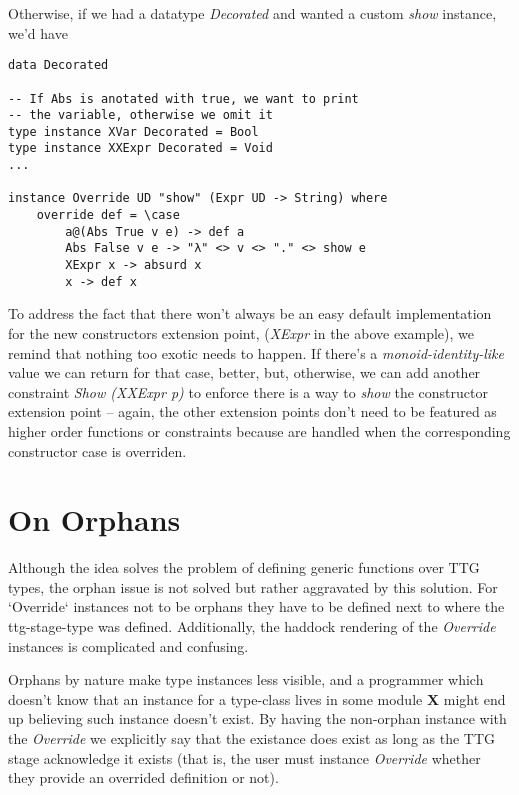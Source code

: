 \documentclass{article}
\begin{document}
Otherwise, if we had a datatype \emph{Decorated} and wanted a custom \emph{show}
instance, we'd have

\begin{lstlisting}
data Decorated

-- If Abs is anotated with true, we want to print
-- the variable, otherwise we omit it
type instance XVar Decorated = Bool
type instance XXExpr Decorated = Void
...

instance Override UD "show" (Expr UD -> String) where
    override def = \case
        a@(Abs True v e) -> def a
        Abs False v e -> "λ" <> v <> "." <> show e
        XExpr x -> absurd x
        x -> def x
\end{lstlisting}

To address the fact that there won't always be an easy default implementation
for the new constructors extension point, (\emph{XExpr} in the above example),
we remind that nothing too exotic needs to happen. If there's a
\emph{monoid-identity-like} value we can return for that case, better, but,
otherwise, we can add another constraint \emph{Show (XXExpr p)} to enforce there
is a way to \emph{show} the constructor extension point -- again, the other
extension points don't need to be featured as higher order functions or
constraints because are handled when the corresponding constructor case is
overriden.

\section{On Orphans}

Although the idea solves the problem of defining generic functions over TTG
types, the orphan issue is not solved but rather aggravated by this solution.
For `Override` instances not to be orphans they have to be defined next to where
the ttg-stage-type was defined. Additionally, the haddock rendering of the
\emph{Override} instances is complicated and confusing.


Orphans by nature make type instances less visible, and a programmer which
doesn't know that an instance for a type-class lives in some module \textbf{X}
might end up believing such instance doesn't exist. By having the non-orphan
instance with the \emph{Override} we explicitly say that the existance does
exist as long as the TTG stage acknowledge it exists (that is, the user must
instance \emph{Override} whether they provide an overrided definition or not).
\end{document}
